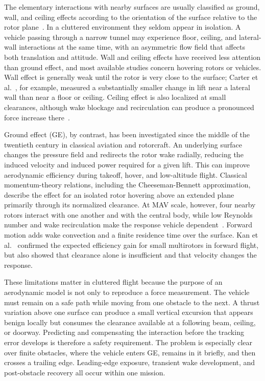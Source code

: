 \documentclass[journal]{IEEEtran}
\begin{document}
The elementary interactions with nearby surfaces are usually classified as ground, wall, and ceiling effects according to the orientation of the surface relative to the rotor plane~\cite{Matus2020,Carter2021,Franzetti2024}. In a cluttered environment they seldom appear in isolation. A vehicle passing through a narrow tunnel may experience floor, ceiling, and lateral-wall interactions at the same time, with an asymmetric flow field that affects both translation and attitude. Wall and ceiling effects have received less attention than ground effect, and most available studies concern hovering rotors or vehicles. Wall effect is generally weak until the rotor is very close to the surface; Carter et al.~\cite{Carter2021}, for example, measured a substantially smaller change in lift near a lateral wall than near a floor or ceiling. Ceiling effect is also localized at small clearances, although wake blockage and recirculation can produce a pronounced force increase there~\cite{Franzetti2024,Cai2024}.

Ground effect (GE), by contrast, has been investigated since the middle of the twentieth century in classical aviation and rotorcraft. An underlying surface changes the pressure field and redirects the rotor wake radially, reducing the induced velocity and induced power required for a given lift. This can improve aerodynamic efficiency during takeoff, hover, and low-altitude flight. Classical momentum-theory relations, including the Cheeseman-Bennett approximation, describe the effect for an isolated rotor hovering above an extended plane primarily through its normalized clearance. At MAV scale, however, four nearby rotors interact with one another and with the central body, while low Reynolds number and wake recirculation make the response vehicle dependent~\cite{Matus2020,Carter2021}. Forward motion adds wake convection and a finite residence time over the surface. Kan et al.~\cite{Kan2019} confirmed the expected efficiency gain for small multirotors in forward flight, but also showed that clearance alone is insufficient and that velocity changes the response.

These limitations matter in cluttered flight because the purpose of an aerodynamic model is not only to reproduce a force measurement. The vehicle must remain on a safe path while moving from one obstacle to the next. A thrust variation above one surface can produce a small vertical excursion that appears benign locally but consumes the clearance available at a following beam, ceiling, or doorway. Predicting and compensating the interaction before the tracking error develops is therefore a safety requirement. The problem is especially clear over finite obstacles, where the vehicle enters GE, remains in it briefly, and then crosses a trailing edge. Leading-edge exposure, transient wake development, and post-obstacle recovery all occur within one mission.
\end{document}

